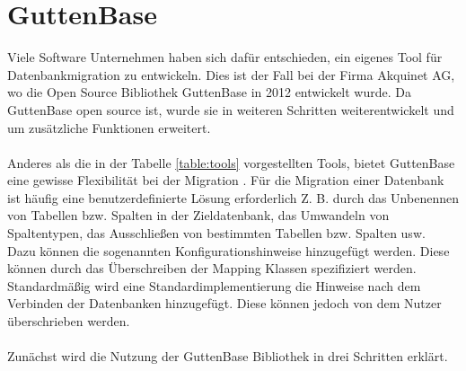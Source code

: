 \section{GuttenBase}
\label{section:grundlagen:gb}
Viele Software Unternehmen haben sich dafür entschieden, ein eigenes Tool für Datenbankmigration zu entwickeln. Dies ist der Fall bei der Firma Akquinet AG, wo die Open Source Bibliothek GuttenBase in 2012 entwickelt wurde. Da GuttenBase open source ist, wurde sie in weiteren Schritten weiterentwickelt und um zusätzliche Funktionen erweitert.\\ \\
Anderes als die in der Tabelle \ref{table:tools} vorgestellten Tools, bietet GuttenBase eine gewisse Flexibilität bei der Migration
.
Für die Migration einer Datenbank ist häufig eine benutzerdefinierte Lösung erforderlich Z. B. durch das Unbenennen von Tabellen bzw. Spalten in der Zieldatenbank, das Umwandeln von Spaltentypen, das Ausschließen von bestimmten Tabellen bzw. Spalten usw. \\

Dazu können die sogenannten Konfigurationshinweise hinzugefügt werden. Diese können durch das Überschreiben der Mapping Klassen spezifiziert werden. Standardmäßig wird eine Standardimplementierung die Hinweise nach dem Verbinden der Datenbanken hinzugefügt. Diese können jedoch von dem Nutzer überschrieben werden. \\ \\
Zunächst wird die Nutzung der GuttenBase Bibliothek in drei Schritten erklärt.
